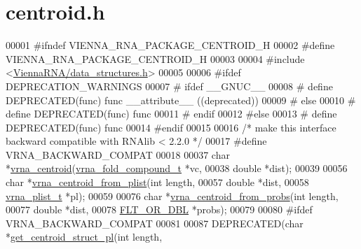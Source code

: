 \hypertarget{centroid_8h_source}{\section{centroid.\+h}
\label{centroid_8h_source}
}

\begin{DoxyCode}
00001 \textcolor{preprocessor}{#ifndef VIENNA\_RNA\_PACKAGE\_CENTROID\_H}
00002 \textcolor{preprocessor}{#define VIENNA\_RNA\_PACKAGE\_CENTROID\_H}
00003 
00004 \textcolor{preprocessor}{#include <\hyperlink{data__structures_8h}{ViennaRNA/data\_structures.h}>}
00005 
00006 \textcolor{preprocessor}{#ifdef DEPRECATION\_WARNINGS}
00007 \textcolor{preprocessor}{# ifdef \_\_GNUC\_\_}
00008 \textcolor{preprocessor}{#  define DEPRECATED(func) func \_\_attribute\_\_ ((deprecated))}
00009 \textcolor{preprocessor}{# else}
00010 \textcolor{preprocessor}{#  define DEPRECATED(func) func}
00011 \textcolor{preprocessor}{# endif}
00012 \textcolor{preprocessor}{#else}
00013 \textcolor{preprocessor}{# define DEPRECATED(func) func}
00014 \textcolor{preprocessor}{#endif}
00015 
00016 \textcolor{comment}{/* make this interface backward compatible with RNAlib < 2.2.0 */}
00017 \textcolor{preprocessor}{#define VRNA\_BACKWARD\_COMPAT}
00018 
00037 \textcolor{keywordtype}{char} *\hyperlink{group__centroid__fold_ga0e64bb67e51963dc71cbd4d30b80a018}{vrna\_centroid}(\hyperlink{group__fold__compound_structvrna__fc__s}{vrna\_fold\_compound\_t} *vc,
00038                     \textcolor{keywordtype}{double} *dist);
00039 
00056 \textcolor{keywordtype}{char}  *\hyperlink{group__centroid__fold_ga70525a53b879c1427f9ea546c96fa1c5}{vrna\_centroid\_from\_plist}(\textcolor{keywordtype}{int} length,
00057                                 \textcolor{keywordtype}{double} *dist,
00058                                 \hyperlink{group__data__structures_structvrna__plist__s}{vrna\_plist\_t} *pl);
00059 
00076 \textcolor{keywordtype}{char}  *\hyperlink{group__centroid__fold_ga98193ede06778a9ea966cc8fc43d0804}{vrna\_centroid\_from\_probs}(\textcolor{keywordtype}{int} length,
00077                                 \textcolor{keywordtype}{double} *dist,
00078                                 \hyperlink{group__data__structures_ga31125aeace516926bf7f251f759b6126}{FLT\_OR\_DBL} *probs);
00079 
00080 \textcolor{preprocessor}{#ifdef VRNA\_BACKWARD\_COMPAT}
00081 
00087 DEPRECATED(\textcolor{keywordtype}{char}  *\hyperlink{centroid_8h_a8f387bf1583fb5eaf5f4ffd78493e43e}{get\_centroid\_struct\_pl}(\textcolor{keywordtype}{int} length,

\end{DoxyCode}
